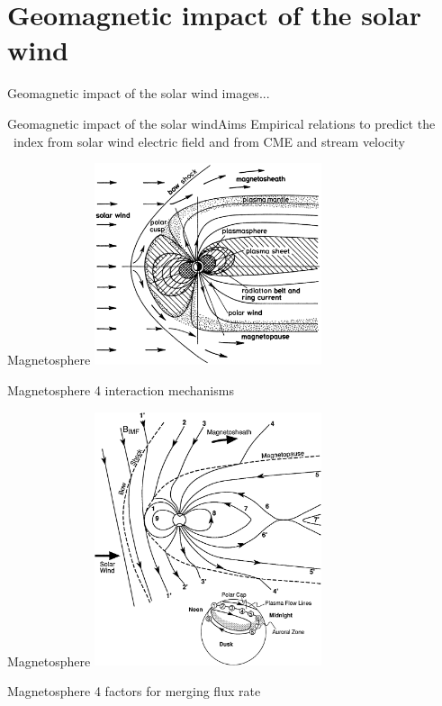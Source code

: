 \section{Geomagnetic impact of the solar wind}

\begin{frame}[c]{Geomagnetic impact of the solar wind}{}
	images...
\end{frame}
\begin{frame}[c]{Geomagnetic impact of the solar wind}{Aims}
	Empirical relations to predict the \Kp~index from solar wind electric field and from CME and stream velocity
\end{frame}

\begin{frame}[c]{Magnetosphere}{}
	\includegraphics[width=0.5\textwidth]{../figures_of_others/images/Davies1990_magnetosphere_sharpened.png}
\end{frame}
\begin{frame}[c]{Magnetosphere}{}
	4 interaction mechanisms
\end{frame}
\begin{frame}[c]{Magnetosphere}{}
	\includegraphics[width=0.5\textwidth]{../figures_of_others/images/Kivelson1995_fig9_11_dungey_cycle.png}
\end{frame}
\begin{frame}[c]{Magnetosphere}{}
	4 factors for merging flux rate
\end{frame}

